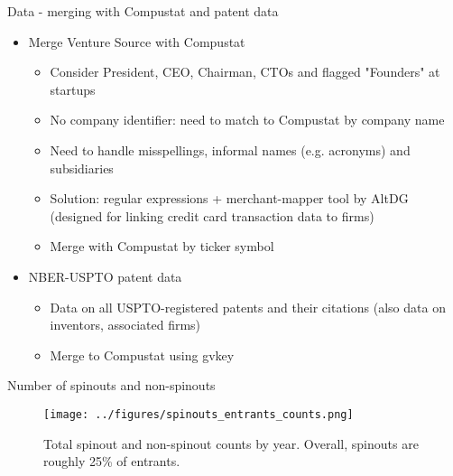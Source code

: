 \documentclass[english,usenames,dvipsnames]{beamer}
\begin{document}
\begin{frame}{Data - merging with Compustat and patent data}
\begin{itemize}
	\item Merge Venture Source with Compustat
	\begin{itemize}
		\item Consider President, CEO, Chairman, CTOs and flagged "Founders" at startups
		\item No company identifier: need to match to Compustat by company name
		\item Need to handle misspellings, informal names (e.g. acronyms) and subsidiaries
		\item \alert{Solution:} regular expressions + merchant-mapper tool by AltDG (designed for linking credit card transaction data to firms)
		\item Merge with Compustat by ticker symbol
	\end{itemize}
	\item NBER-USPTO patent data
	\begin{itemize}
		\item Data on all USPTO-registered patents and their citations (also data on inventors, associated firms)
		\item Merge to Compustat using gvkey
	\end{itemize}
\end{itemize}
\end{frame}

\begin{frame}{Number of spinouts and non-spinouts}
\begin{figure}
	\texttt{[image: ../figures/spinouts\_entrants\_counts.png]}
	\caption{Total spinout and non-spinout counts by year. Overall, spinouts are roughly 25\% of entrants.}
\end{figure}
\end{frame}
\end{document}

